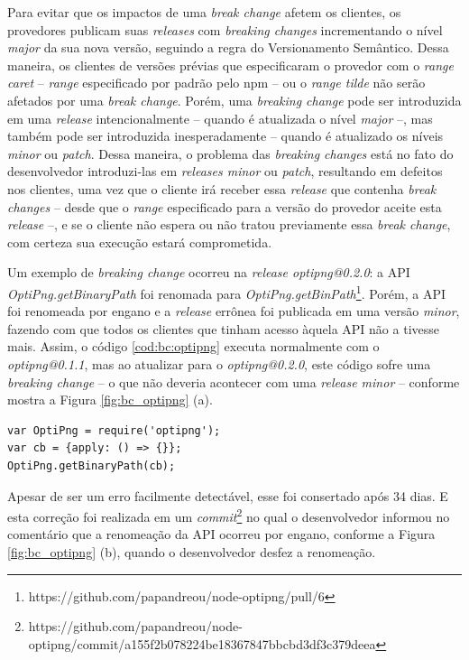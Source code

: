 Para evitar que os impactos de uma \textit{break change} afetem os clientes, os provedores publicam suas \textit{releases} com \textit{breaking changes} incrementando o nível \textit{major} da sua nova versão, seguindo a regra do Versionamento Semântico. Dessa maneira, os clientes de versões prévias que especificaram o provedor com o \textit{range caret} -- \textit{range} especificado por padrão pelo \gls{npm} -- ou o \textit{range tilde} não serão afetados por uma \textit{break change}. Porém, uma \textit{breaking change} pode ser introduzida em uma \textit{release} intencionalmente -- quando é atualizada o nível \textit{major} --, mas também pode ser introduzida inesperadamente -- quando é atualizado os níveis \textit{minor} ou \textit{patch}. Dessa maneira, o problema das \textit{breaking changes} está no fato do desenvolvedor introduzi-las em \textit{releases minor} ou \textit{patch}, resultando em defeitos nos clientes, uma vez que o cliente irá receber essa \textit{release} que contenha \textit{break changes} -- desde que o \textit{range} especificado para a versão do provedor aceite esta \textit{release} --, e se o cliente não espera ou não tratou previamente essa \textit{break change}, com certeza sua execução estará comprometida.

Um exemplo de \textit{breaking change} ocorreu na \textit{release optipng@0.2.0}: a \gls{API} \textit{OptiPng.getBinaryPath} foi renomada para \textit{OptiPng.getBinPath}\footnote{https://github.com/papandreou/node-optipng/pull/6}. Porém, a \gls{API} foi renomeada por engano e a \textit{release} errônea foi publicada em uma versão \textit{minor}, fazendo com que todos os clientes que tinham acesso àquela \gls{API} não a tivesse mais. Assim, o código \ref{cod:bc:optipng} executa normalmente com o \textit{optipng@0.1.1}, mas ao atualizar para o \textit{optipng@0.2.0}, este código sofre uma \textit{breaking change} -- o que não deveria acontecer com uma \textit{release minor}  -- conforme mostra a Figura \ref{fig:bc_optipng} (a).

\begin{lstlisting}[style=Javascript, label=cod:bc:optipng, caption={Código que sofre \textit{breaking change} do \textit{optipng}}]
var OptiPng = require('optipng');
var cb = {apply: () => {}};
OptiPng.getBinaryPath(cb);
\end{lstlisting}

Apesar de ser um erro facilmente detectável, esse foi consertado após 34 dias. E esta correção foi realizada em um \textit{commit}\footnote{https://github.com/papandreou/node-optipng/commit/a155f2b078224be18367847bbcbd3df3c379deea} no qual o desenvolvedor informou no comentário que a renomeação da \gls{API} ocorreu por engano, conforme a Figura \ref{fig:bc_optipng} (b), quando o desenvolvedor desfez a renomeação.

